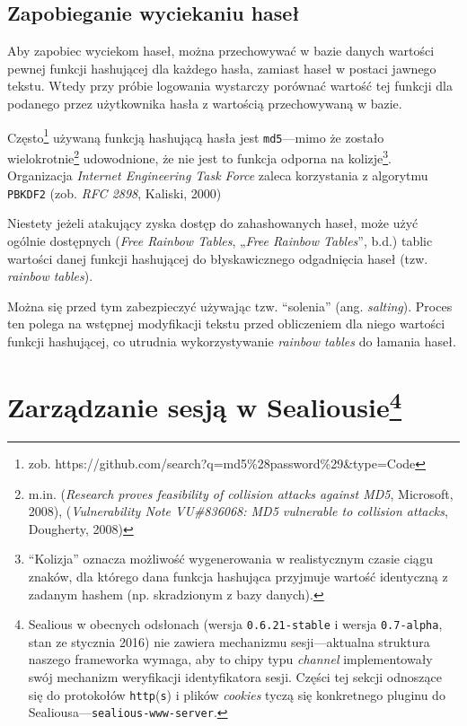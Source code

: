 \documentclass[12pt,polish,a4paper,]{report}
\begin{document}
\subsection{Zapobieganie wyciekaniu
haseł}\label{zapobieganie-wyciekaniu-haseux142}

Aby zapobiec wyciekom haseł, można przechowywać w bazie danych wartości
pewnej funkcji hashującej dla każdego hasła, zamiast haseł w postaci
jawnego tekstu. Wtedy przy próbie logowania wystarczy porównać wartość
tej funkcji dla podanego przez użytkownika hasła z wartością
przechowywaną w bazie.

Często\footnote{zob.
  https://github.com/search?q=md5\%28password\%29\&type=Code} używaną
funkcją hashującą hasła jest \texttt{md5}---mimo że zostało
wielokrotnie\footnote{m.in. (\emph{Research proves feasibility of
  collision attacks against MD5}, Microsoft, 2008), (\emph{Vulnerability
  Note VU\#836068: MD5 vulnerable to collision attacks}, Dougherty,
  2008)} udowodnione, że nie jest to funkcja odporna na
kolizje\footnote{``Kolizja'' oznacza możliwość wygenerowania w
  realistycznym czasie ciągu znaków, dla którego dana funkcja hashująca
  przyjmuje wartość identyczną z zadanym hashem (np. skradzionym z bazy
  danych).}. Organizacja \emph{Internet Engineering Task Force} zaleca
korzystania z algorytmu \texttt{PBKDF2} (zob. \emph{RFC 2898}, Kaliski,
2000)

Niestety jeżeli atakujący zyska dostęp do zahashowanych haseł, może użyć
ogólnie dostępnych (\emph{Free Rainbow Tables}, „\emph{Free Rainbow
Tables}'', b.d.) tablic wartości danej funkcji hashującej do
błyskawicznego odgadnięcia haseł (tzw. \emph{rainbow tables}).

Można się przed tym zabezpieczyć używając tzw. ``solenia'' (ang.
\emph{salting}). Proces ten polega na wstępnej modyfikacji tekstu przed
obliczeniem dla niego wartości funkcji hashującej, co utrudnia
wykorzystywanie \emph{rainbow tables} do łamania haseł.

\section[Zarządzanie sesją w Sealiousie]{\texorpdfstring{Zarządzanie
sesją w Sealiousie\footnote{Sealious w obecnych odsłonach (wersja
  \texttt{0.6.21-stable} i wersja \texttt{0.7-alpha}, stan ze stycznia
  2016) nie zawiera mechanizmu sesji---aktualna struktura naszego
  frameworka wymaga, aby to chipy typu \emph{channel} implementowały
  swój mechanizm weryfikacji identyfikatora sesji. Części tej sekcji
  odnoszące się do protokołów \texttt{http}(\texttt{s}) i plików
  \emph{cookies} tyczą się konkretnego pluginu do
  Sealiousa---\texttt{sealious-www-server}.}}{Zarządzanie sesją w Sealiousie}}\label{zarzux105dzanie-sesjux105-w-sealiousiechannelux5fresponsibilityux5ffootnote}
\end{document}
